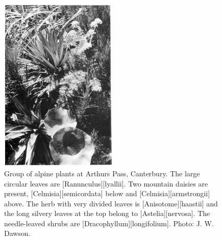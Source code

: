 \begin{figure}
	\includegraphics[width=0.5\textwidth]{graphics/figure100alpine-plants.jpg}
	\centering
	\caption[Alpine plants at Arthurs Pass]{Group of alpine plants at Arthurs Pass, Canterbury.
	The large circular leaves are [Ranunculus][lyallii].
	Two mountain daisies are present, [Celmisia][semicordata]  below and [Celmisia][armstrongii] above.
	The herb with very divided leaves is [Anisotome][haastii] and the long silvery leaves at the top belong to [Astelia][nervosa].
	The needle-leaved shrubs are [Dracophyllum][longifolium].
	Photo: J. W. Dawson.}%
	\label{fig:100alpine-plants}
\end{figure}

